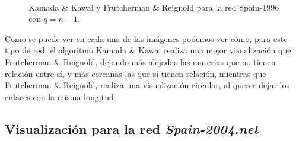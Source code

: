 \documentclass[paper=a4, fontsize=11pt]{article} %
\numberwithin{equation}{section} %
\numberwithin{figure}{section} %
\numberwithin{table}{section} %
\begin{document}
\begin{figure}[H]
    \centering
    \mbox {
      \qquad
    }
    \caption{Kamada \& Kawai y Frutcherman \& Reignold para la red Spain-1996 con $q=n-1$.}
    \label{spqN-1}
\end{figure}

Como se puede ver en cada una de las imágenes podemos ver cómo, para este tipo de red, el algoritmo Kamada \& Kawai realiza una mejor visualización que Frutcherman \& Reignold, dejando más alejadas las materias que no tienen relación entre sí, y más cercanas las que sí tienen relación, mientras que Frutcherman \& Reignold, realiza una visualización circular, al querer dejar los enlaces con la misma longitud.

\subsection{Visualización para la red \textit{Spain-2004.net}}
\end{document}
